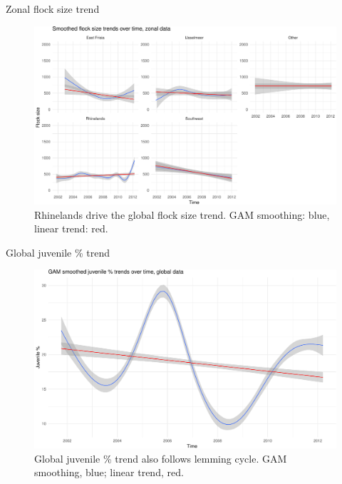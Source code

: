 \documentclass[10pt,ignorenonframetext,]{beamer}
\begin{document}
\begin{frame}{Zonal flock size trend}

\begin{figure}[htbp]
\centering
\includegraphics{goose_code008pres_files/figure-beamer/trend_flock_juv_zonal-1.pdf}
\caption{Rhinelands drive the global flock size trend. GAM smoothing:
blue, linear trend: red.}
\end{figure}

\end{frame}

\begin{frame}{Global juvenile \% trend}

\begin{figure}[htbp]
\centering
\includegraphics{goose_code008pres_files/figure-beamer/trend_juv_global-1.pdf}
\caption{Global juvenile \% trend also follows lemming cycle. GAM
smoothing, blue; linear trend, red.}
\end{figure}

\end{frame}
\end{document}
